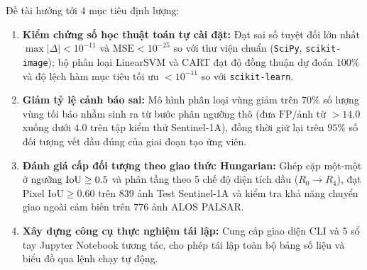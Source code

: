 Đề tài hướng tới 4 mục tiêu định lượng:
\begin{enumerate}
    \item \textbf{Kiểm chứng số học thuật toán tự cài đặt:} Đạt sai số tuyệt đối lớn nhất $\max |\Delta| < 10^{-11}$ và $\text{MSE} < 10^{-25}$ so với thư viện chuẩn (\texttt{SciPy}, \texttt{scikit-image}); bộ phân loại LinearSVM và CART đạt độ đồng thuận dự đoán $100\%$ và độ lệch hàm mục tiêu tối ưu $< 10^{-11}$ so với \texttt{scikit-learn}.
    \item \textbf{Giảm tỷ lệ cảnh báo sai:} Mô hình phân loại vùng giảm trên $70\%$ số lượng vùng tối báo nhầm sinh ra từ bước phân ngưỡng thô (đưa $\text{FP/ảnh}$ từ $>14.0$ xuống dưới $4.0$ trên tập kiểm thử Sentinel-1A), đồng thời giữ lại trên $95\%$ số đối tượng vết dầu đúng của giai đoạn tạo ứng viên.
    \item \textbf{Đánh giá cấp đối tượng theo giao thức Hungarian:} Ghép cặp một-một ở ngưỡng $\mathrm{IoU} \ge 0.5$ và phân tầng theo 5 chế độ diện tích dầu ($R_0 \to R_4$), đạt $\text{Pixel IoU} \ge 0.60$ trên $839$ ảnh Test Sentinel-1A và kiểm tra khả năng chuyển giao ngoài cảm biến trên $776$ ảnh ALOS PALSAR.
    \item \textbf{Xây dựng công cụ thực nghiệm tái lập:} Cung cấp giao diện CLI và 5 sổ tay Jupyter Notebook tương tác, cho phép tái lập toàn bộ bảng số liệu và biểu đồ qua lệnh chạy tự động.
\end{enumerate}
